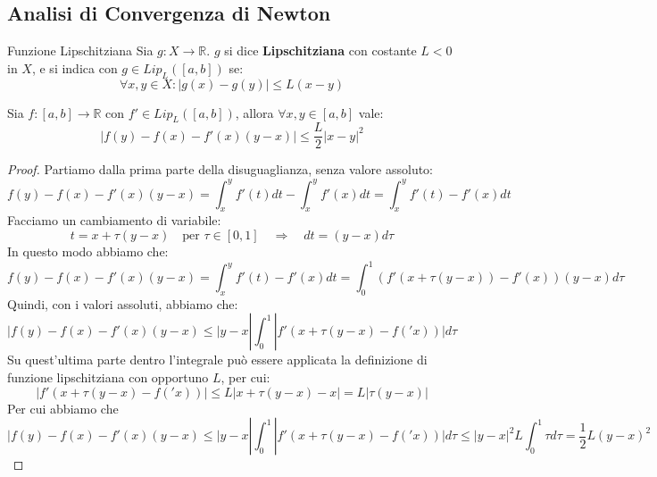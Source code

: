 \documentclass[11pt,a4paper,twoside]{article}
\theoremstyle{definition}
\begin{document}
\subsection{Analisi di Convergenza di Newton}

\begin{defn}{Funzione Lipschitziana}{}
	Sia $g:X \to \mathbb R$. $g$ si dice \textbf{Lipschitziana} con costante $L<0$ in $X$, e si indica con $g \in Lip_L([a,b])$ se:
	\[ \forall x,y \in X: |g(x) - g(y)| \leq L(x-y) \]
\end{defn}

\begin{lemma}{}{}
	Sia $f:[a,b] \to \mathbb R$ con $f' \in Lip_L([a,b])$, allora $\forall x,y \in [a,b]$ vale:
	\[ |f(y) - f(x) - f'(x)(y-x)| \leq \frac L2|x-y|^2 \]
\end{lemma}
\begin{proof}
	Partiamo dalla prima parte della disuguaglianza, senza valore assoluto:
	\[ f(y) - f(x) - f'(x)(y-x) = \int_x^y f'(t)dt - \int_x^y f'(x)dt = \int_x^y f'(t) - f'(x)dt \]
	Facciamo un cambiamento di variabile:
	\[ t = x + \tau(y-x) \quad \text{per }\tau \in [0,1] \quad \Rightarrow \quad dt = (y-x)d\tau \]
	In questo modo abbiamo che:
	\[ f(y) - f(x) - f'(x)(y-x) = \int_x^y f'(t) - f'(x)dt = \int_0^1 (f'(x + \tau(y-x)) - f'(x))(y-x)d\tau \]
	Quindi, con i valori assoluti, abbiamo che:
	\[ |f(y)-f(x)-f'(x)(y-x) \leq |y-x| \int_0^1 |f'(x + \tau(y-x) - f('x))|d\tau \]
	Su quest'ultima parte dentro l'integrale può essere applicata la definizione di funzione lipschitziana con opportuno $L$, per cui:
	\[ |f'(x + \tau(y-x) - f('x))| \leq L|x + \tau(y-x) -x| = L|\tau(y-x)|\]
	Per cui abbiamo che
	\[ |f(y)-f(x)-f'(x)(y-x) \leq |y-x| \int_0^1 |f'(x + \tau(y-x) - f('x))|d\tau  \leq |y-x|^2 L \int_0^1 \tau d \tau = \frac 12 L(y-x)^2\]
\end{proof}
\end{document}

